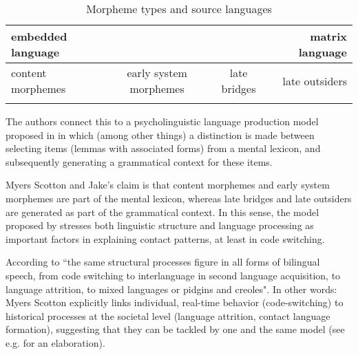 \begin{table}
\small
\caption{Morpheme types and source languages}  
\label{tab-ms-model}
 \begin{tabular}{lccr}
  \lsptoprule
 embedded language & & & matrix language\\ 
  \midrule
  content morphemes & early system morphemes & late bridges & late outsiders\\ 
   \lspbottomrule
 \end{tabular}
\end{table}

The authors connect this to a psycholinguistic language production model proposed in \cite{levelt1989speaking} in which (among other things) a distinction is made between selecting items (lemmas with associated forms) from a mental lexicon, and subsequently generating a grammatical context for these items.

Myers Scotton and Jake's claim is that content morphemes and early system morphemes are part of the mental lexicon, whereas late bridges and late outsiders are generated as part of the grammatical context. In this sense, the model proposed by \cite{myersetal2009universal} stresses both linguistic structure and language processing as important factors in explaining contact patterns, at least in code switching. 

According to \cite[291]{myers1998way} ``the same structural processes figure in all forms of bilingual speech, from code switching to interlanguage in second language acquisition, to language attrition, to mixed languages or pidgins and creoles". In other words: Myers Scotton explicitly links individual, real-time behavior (code-switching) to historical processes at the societal level (language attrition, contact language formation), suggesting that they can be tackled by one and the same model (see e.g. \citealt{myers1998way} for an elaboration).\\


